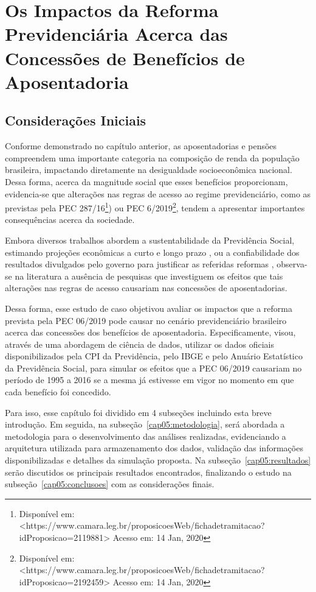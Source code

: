 \chapter{Os Impactos da Reforma Previdenciária Acerca das Concessões de Benefícios de Aposentadoria}

\section{Considerações Iniciais}

Conforme demonstrado no capítulo anterior, as aposentadorias e pensões compreendem uma importante categoria na composição de renda da população brasileira, impactando diretamente na desigualdade socioeconômica nacional. Dessa forma, acerca da magnitude social que esses benefícios proporcionam, evidencia-se que alterações nas regras de acesso ao regime previdenciário, como as previstas pela PEC 287/16\footnote{Disponível em: <https://www.camara.leg.br/proposicoesWeb/fichadetramitacao?idProposicao=2119881> Acesso em: 14 Jan, 2020}) ou PEC 6/2019\footnote{Disponível em: <https://www.camara.leg.br/proposicoesWeb/fichadetramitacao?idProposicao=2192459> Acesso em: 14 Jan, 2020}, tendem a apresentar importantes consequências acerca da sociedade. 

Embora diversos trabalhos abordem a sustentabilidade da Previdência Social, estimando projeções econômicas a curto e longo prazo \cite{cap03_ref5, cap05_ref9}, ou a confiabilidade dos resultados divulgados pelo governo para justificar as referidas reformas \cite{cap05_ref10, cap01_ref3}, observa-se na literatura a ausência de pesquisas que investiguem os efeitos que tais alterações nas regras de acesso causariam nas concessões de aposentadorias.

Dessa forma, esse estudo de caso objetivou avaliar os impactos que a reforma prevista pela PEC 06/2019 pode causar no cenário previdenciário brasileiro acerca das concessões dos benefícios de aposentadoria. Especificamente, visou, através de uma abordagem de ciência de dados, utilizar os dados oficiais disponibilizados pela CPI da Previdência, pelo IBGE e pelo Anuário Estatístico da Previdência Social, para simular os efeitos que a PEC 06/2019 causariam no período de 1995 a 2016 se a mesma já estivesse em vigor no momento em que cada benefício foi concedido.

Para isso, esse capítulo foi dividido em 4 subseções incluindo esta breve introdução. Em seguida, na subseção~\ref{cap05:metodologia}, será abordada a metodologia para o desenvolvimento das análises realizadas, evidenciando a arquitetura utilizada para armazenamento dos dados, validação das informações disponibilizadas e detalhes da simulação proposta. Na subseção~\ref{cap05:resultados} serão discutidos os principais resultados encontrados, finalizando o estudo na subseção~\ref{cap05:conclusoes} com as considerações finais. 

